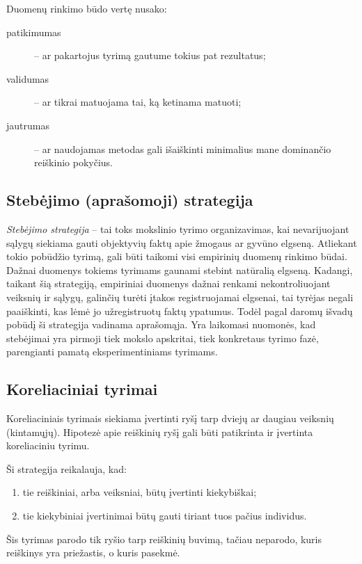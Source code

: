 Duomenų rinkimo būdo vertę nusako:
\begin{description}
  \item[patikimumas] – ar pakartojus tyrimą gautume tokius pat rezultatus;
  \item[validumas] – ar tikrai matuojama tai, ką ketinama matuoti;
  \item[jautrumas] – ar naudojamas metodas gali išaiškinti minimalius
    mane dominančio reiškinio pokyčius.
\end{description}

\subsection{Stebėjimo (aprašomoji) strategija}

\emph{Stebėjimo strategija} – tai toks mokslinio tyrimo organizavimas, kai 
nevarijuojant sąlygų siekiama gauti objektyvių faktų apie žmogaus ar gyvūno 
elgseną. Atliekant tokio pobūdžio tyrimą, gali būti taikomi visi empirinių 
duomenų rinkimo būdai. Dažnai duomenys tokiems tyrimams gaunami stebint 
natūralią elgseną. Kadangi, taikant šią strategiją, empiriniai duomenys 
dažnai renkami nekontroliuojant veiksnių ir sąlygų, galinčių turėti įtakos 
registruojamai elgsenai, tai tyrėjas negali paaiškinti, kas lėmė jo 
užregistruotų faktų ypatumus. Todėl pagal daromų išvadų pobūdį ši 
strategija vadinama aprašomąja. Yra laikomasi nuomonės, kad stebėjimai 
yra pirmoji tiek mokslo apskritai, tiek konkretaus tyrimo fazė, parengianti 
pamatą eksperimentiniams tyrimams.

\subsection{Koreliaciniai tyrimai}

Koreliaciniais tyrimais siekiama įvertinti ryšį tarp dviejų ar daugiau 
veiksnių (kintamųjų). Hipotezė apie reiškinių ryšį gali būti patikrinta ir 
įvertinta koreliaciniu tyrimu. 

Ši strategija reikalauja, kad: 
\begin{enumerate}
  \item tie reiškiniai, arba veiksniai, būtų įvertinti kiekybiškai;
  \item tie kiekybiniai įvertinimai būtų gauti tiriant tuos pačius 
    individus.
\end{enumerate}

Šis tyrimas parodo tik ryšio tarp reiškinių buvimą, tačiau neparodo,
kuris reiškinys yra priežastis, o kuris pasekmė.

